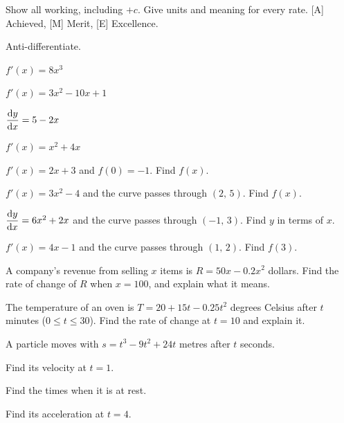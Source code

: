 \documentclass[11pt]{article}
\begin{document}
Show all working, including $+c$. Give units and meaning for every rate. [A] Achieved, [M] Merit, [E] Excellence.

\Q Anti-differentiate.
\begin{parts}
\item $f'(x)=8x^{3}$
\item $f'(x)=3x^{2}-10x+1$
\item $\dfrac{\mathrm{d}y}{\mathrm{d}x}=5-2x$
\item $f'(x)=x^{2}+4x$
\end{parts}

\Q $f'(x)=2x+3$ and $f(0)=-1$. Find $f(x)$.

\Q $f'(x)=3x^{2}-4$ and the curve passes through $(2,\,5)$. Find $f(x)$.

\Q $\dfrac{\mathrm{d}y}{\mathrm{d}x}=6x^{2}+2x$ and the curve passes through $(-1,\,3)$. Find $y$ in terms of $x$.

\Q $f'(x)=4x-1$ and the curve passes through $(1,\,2)$. Find $f(3)$.

\Q A company's revenue from selling $x$ items is $R=50x-0.2x^{2}$ dollars. Find the rate of change of $R$ when $x=100$, and explain what it means.

\Q The temperature of an oven is $T=20+15t-0.25t^{2}$ degrees Celsius after $t$ minutes ($0\le t\le30$). Find the rate of change at $t=10$ and explain it.

\Q A particle moves with $s=t^{3}-9t^{2}+24t$ metres after $t$ seconds.
\begin{parts}
\item Find its velocity at $t=1$.
\item Find the times when it is at rest.
\item Find its acceleration at $t=4$.
\end{parts}
\end{document}
